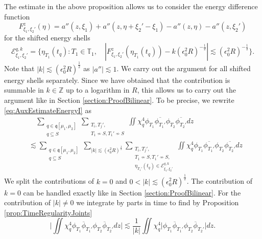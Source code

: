 \documentclass{amsart}
\theoremstyle{definition}
\newcommand{\T}{\mathbb{T}}
\newcommand{\Z}{\mathbb{Z}}
\begin{document}
The estimate in the above proposition allows us to consider the energy difference function
\begin{equation*}
F^z_{\xi_1,\xi_2'}(\eta) =a''(z,\xi_1)+a''(z,\eta+\xi_{2}'-\xi_{1})-a''(z,\eta) - a''(z,\xi_{2}')
\end{equation*}
for the shifted energy shells
\begin{equation*}
\mathcal{E}^{q,k}_{\xi_1,\xi_2'} = \{ \eta_{T_1}(t_q) : T_1 \in \T_1, \quad |F^{z}_{\xi_1,\xi_2'}(\eta_{T_1}(t_q)) - k (\epsilon_0^2 R)^{-\frac{1}{2}}| \lesssim (\epsilon_0^2 R)^{-\frac{1}{2}} \}.
\end{equation*}
Note that $|k| \lesssim (\epsilon_0^2 R)^{\frac{1}{2}}$ as $|a''| \lesssim 1$.
We carry out the argument for all shifted energy shells separately. Since we have obtained that the contribution is summable in $k \in \Z$ up to a logarithm in $R$, this allows us to carry out the argument like in Section \ref{section:ProofBilinear}.
To be precise, we rewrite \eqref{eq:AuxEstimateEnergyI} as
\begin{equation*}
\begin{split}
    &\quad \sum_{\substack{q \in \mathfrak{q}[\mu_1,\mu_2] \\  q \subseteq S}} \sum_{\substack{T_i,T_j',\\ T_1 \not\sim S, T_1' \not\sim S}} \iint \chi_q^4 \phi_{T_1} \overline{\phi_{T_1'}} \phi_{T_2} \overline{\phi_{T_2'}} dz \\
    &\lesssim \sum_{\substack{q \in \mathfrak{q}[\mu_1,\mu_2] \\  q \subseteq S}} \sum_{|k| \lesssim (\epsilon_0^2 R)^{\frac{1}{2}}} \sum_{\substack{T_i,T_j',\\ T_1 \not\sim S, T_1' \not\sim S, \\ \eta_{T_1'}(t_q) \in \mathcal{E}^{q,k}_{\xi_1,\xi_2'}}} \iint \chi_q^4 \phi_{T_1} \overline{\phi_{T_1'}} \phi_{T_2} \overline{\phi_{T_2'}} dz
\end{split}
\end{equation*}
We split the contributions of $k=0$ and $0 < |k| \lesssim (\epsilon_0^2 R)^{\frac{1}{2}}$. The contribution of $k=0$ can be handled exactly like in Section \ref{section:ProofBilinear}. For the contribution of $|k| \neq 0$ we integrate by parts in time to find by Proposition \ref{prop:TimeRegularityJoints}
\begin{equation*}
   \big| \iint \chi_q^4 \phi_{T_1} \overline{\phi}_{T_1'} \phi_{T_2} \overline{\phi}_{T_2'} dz \big| \lesssim \frac{1}{|k|} \iint \chi_q^4 \big| \phi_{T_1} \overline{\phi}_{T_1'} \phi_{T_2} \overline{\phi}_{T_2'} \big| dz.
\end{equation*}
\end{document}
